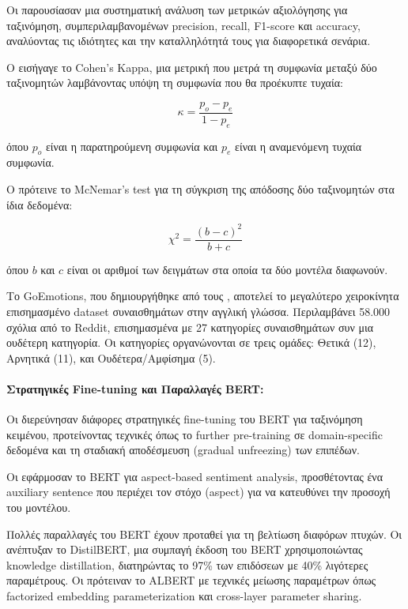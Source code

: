 \documentclass[a4paper,11pt,oneside,openany]{ioniothesis}
\begin{document}
Οι \cite{sokolova2009systematic} παρουσίασαν μια συστηματική ανάλυση των μετρικών αξιολόγησης για ταξινόμηση, συμπεριλαμβανομένων precision, recall, F1-score και accuracy, αναλύοντας τις ιδιότητες και την καταλληλότητά τους για διαφορετικά σενάρια.

Ο \cite{cohen1960coefficient} εισήγαγε το Cohen's Kappa, μια μετρική που μετρά τη συμφωνία μεταξύ δύο ταξινομητών λαμβάνοντας υπόψη τη συμφωνία που θα προέκυπτε τυχαία:

\begin{equation}
\kappa = \frac{p_o - p_e}{1 - p_e}
\end{equation}

όπου $p_o$ είναι η παρατηρούμενη συμφωνία και $p_e$ είναι η αναμενόμενη τυχαία συμφωνία.

Ο \cite{mcnemar1947note} πρότεινε το McNemar's test για τη σύγκριση της απόδοσης δύο ταξινομητών στα ίδια δεδομένα:

\begin{equation}
\chi^2 = \frac{(b - c)^2}{b + c}
\end{equation}

όπου $b$ και $c$ είναι οι αριθμοί των δειγμάτων στα οποία τα δύο μοντέλα διαφωνούν.

Το GoEmotions, που δημιουργήθηκε από τους \cite{demszky2020goemotions}, αποτελεί το μεγαλύτερο χειροκίνητα επισημασμένο dataset συναισθημάτων στην αγγλική γλώσσα. Περιλαμβάνει 58.000 σχόλια από το Reddit, επισημασμένα με 27 κατηγορίες συναισθημάτων συν μια ουδέτερη κατηγορία. Οι κατηγορίες οργανώνονται σε τρεις ομάδες: Θετικά (12), Αρνητικά (11), και Ουδέτερα/Αμφίσημα (5).

\paragraph{Στρατηγικές Fine-tuning και Παραλλαγές BERT:}

Οι \cite{sun2019fine} διερεύνησαν διάφορες στρατηγικές fine-tuning του BERT για ταξινόμηση κειμένου, προτείνοντας τεχνικές όπως το further pre-training σε domain-specific δεδομένα και τη σταδιακή αποδέσμευση (gradual unfreezing) των επιπέδων.

Οι \cite{gao2019target} εφάρμοσαν το BERT για aspect-based sentiment analysis, προσθέτοντας ένα auxiliary sentence που περιέχει τον στόχο (aspect) για να κατευθύνει την προσοχή του μοντέλου.

Πολλές παραλλαγές του BERT έχουν προταθεί για τη βελτίωση διαφόρων πτυχών. Οι \cite{sanh2019distilbert} ανέπτυξαν το DistilBERT, μια συμπαγή έκδοση του BERT χρησιμοποιώντας knowledge distillation, διατηρώντας το 97\% των επιδόσεων με 40\% λιγότερες παραμέτρους. Οι \cite{lan2019albert} πρότειναν το ALBERT με τεχνικές μείωσης παραμέτρων όπως factorized embedding parameterization και cross-layer parameter sharing.
\end{document}
